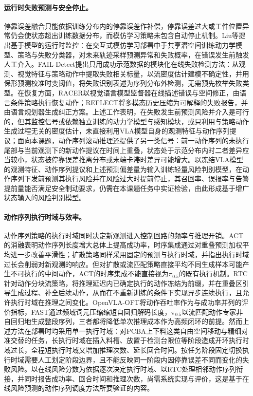 \paragraph{运行时失败预测与安全停止。}停靠误差融合只能依据训练分布内的停靠误差作补偿，停靠误差过大或工件位置异常仍会使状态超出训练数据分布，而模仿学习策略未包含自动停止机制。Liu等提出基于模型的运行时监控：在交互式模仿学习部署中于共享潜空间训练动力学模型、策略与失败分类器，对未来轨迹采样预测异常和失败概率，在错误发生前触发人工介入\cite{liu2024runtimemonitor}。FAIL-Detect提出只用成功示范数据的模块化在线失败检测方法：从观测、视觉特征与策略动作中提取失败相关标量，以流密度估计建模不确定性，并用保形预测校准时变阈值，将失败识别表述为序列分布外检测，无需预先枚举失败类型\cite{xu2025faildetect}。在恢复方面，RACER以视觉语言模型监督器在线描述错误与空间修正，由语言条件策略执行恢复动作\cite{dai2025racer}；REFLECT将多模态历史压缩为可解释的失败报告，并由语言规划器生成纠正方案\cite{liu2023reflect}。上述工作表明，在失败发生前预测风险并介入是可行的，但其监控信号或依赖独立训练的动力学模型与感知模块，或只利用与策略动作生成过程无关的密度估计，未直接利用VLA模型自身的观测特征与动作序列提议；面向本课题，动作序列滚动推理还提供了另一类信号：前一动作序列的未执行尾部与当前观测下的新动作提议在时间上重叠，状态处于示范分布内时二者差异应当较小，状态被停靠误差推离分布或末端卡滞时差异可能增大。以冻结VLA模型的观测特征、动作序列提议和上述预测偏差量为输入训练轻量风险判别模型，在动作序列下发前预测其执行风险并在风险过大时提前停止，其召回率、误报率与告警提前量能否满足安全制动要求，仍需在本课题任务中实证检验，由此形成基于增广状态输入的风险判别模型。

\paragraph{动作序列执行时域与效率。}动作序列策略的执行时域同时决定新观测进入控制回路的频率与推理开销。ACT的消融表明动作序列长度增大总体上提高成功率，时序集成通过对重叠预测加权平均进一步改善平滑性\cite{zhao2023act}；扩散策略同样采用固定的预测与执行时域，并指出执行时域过长会削弱对新观测的响应\cite{chi2023diffusion}。但对扩散或流匹配策略直接平均不同生成样本可能产生不可执行的中间动作，ACT的时序集成不能直接视为\(\pi_{0.5}\)的既有执行机制。RTC针对动作分块流策略，将推理延迟内已确定执行的动作冻结为前缀，并在重叠区引导生成过程、补全后续动作，从而在不重新训练的条件下实现异步连续执行，且允许执行时域在推理之间变化\cite{black2025rtc}。OpenVLA-OFT将动作吞吐率作为与成功率并列的评价指标\cite{kim2025openvlaoft}，FAST通过频域词元压缩缩短自回归解码长度\cite{pertsch2025fast}，\(\pi_{0.5}\)以流匹配动作专家非自回归地生成整段序列\cite{black2025pi05}，三者都将降低单次推理成本作为高频闭环的前提。然而上述方法在部署时均采用单一执行时域：对PCBA上下料这类自由空间移动与精细对准交替的任务，长执行时域在插入料槽、放置于检测台限位等阶段造成开环执行时域过长，全程短执行时域又增加推理次数、延长回合时间。按任务阶段固定切换执行时域需要人工划定阶段边界，且不能反映同一阶段内因停靠误差不同而变化的失败风险。以在线风险分数为依据逐次决定执行时域、以RTC处理相邻动作序列衔接，并同时报告成功率、回合时间和推理次数，尚需系统实现与评价，这是基于在线风险预测的动作序列调度方法所要验证的内容。

